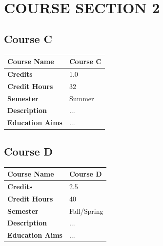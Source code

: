 \documentclass{article}
\begin{document}
\clearpage

\section{COURSE SECTION 2}

\subsection{Course C}
\renewcommand{\arraystretch}{1.5} %
\begin{longtable}{|p{3cm}|p{10cm}|}
\hline
\textbf{Course Name} & Course C\\
\hline
\textbf{Credits} & 1.0 \\
\hline
\textbf{Credit Hours} & 32\\
\hline
\textbf{Semester} & Summer \\
\hline
\textbf{Description} & ... \\
\hline
\textbf{Education Aims} & ... \\
\hline
\end{longtable}


\subsection{Course D}
\renewcommand{\arraystretch}{1.5} %
\begin{longtable}{|p{3cm}|p{10cm}|}
\hline
\textbf{Course Name} & Course D\\
\hline
\textbf{Credits} & 2.5 \\
\hline
\textbf{Credit Hours} & 40\\
\hline
\textbf{Semester} & Fall/Spring \\
\hline
\textbf{Description} & ... \\
\hline
\textbf{Education Aims} & ... \\
\hline
\end{longtable}

\clearpage
\end{document}
